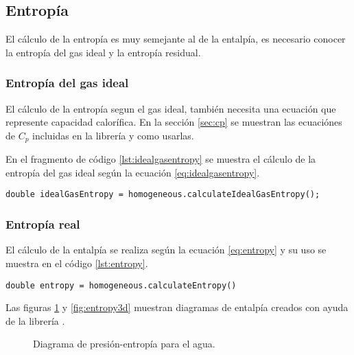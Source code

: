 \subsection{Entropía}

	El cálculo de la entropía es muy semejante al de la entalpía, es necesario conocer la entropía del gas ideal y la entropía residual.

\subsubsection{Entropía del gas ideal}

	El cálculo de la entropía segun el gas ideal, también necesita una ecuación que represente capacidad calorífica. En la sección \ref{sec:cp} se muestran las ecuaciónes de $C_p$ incluidas en la librería y como usarlas.

	En el fragmento de código \ref{lst:idealgasentropy} se muestra el cálculo de la entropía del gas ideal según la ecuación \ref{eq:idealgasentropy}. 

	\begin{lstlisting}[label={lst:idealgasentropy},caption={Cálculo de la entropía absoluta del gas ideal.}]
	double idealGasEntropy = homogeneous.calculateIdealGasEntropy();
	\end{lstlisting}

\subsubsection{Entropía real}

	El cálculo de la entalpía se realiza según la ecuación \ref{eq:entropy} y su uso se muestra en el código \ref{lst:entropy}.

\begin{lstlisting}[label={lst:entropy},caption={Cálculo de la entropía absoluta.}]
	double entropy = homogeneous.calculateEntropy()
\end{lstlisting}

	Las figuras \ref{fig:2dentropy} y \ref{fig:entropy3d} muestran diagramas de entalpía creados con ayuda de la librería \Materia.


\begin{figure}[!h]
	\centering	
	\caption{Diagrama de presión-entropía para el agua.}\label{fig:2dentropy}
\end{figure}



